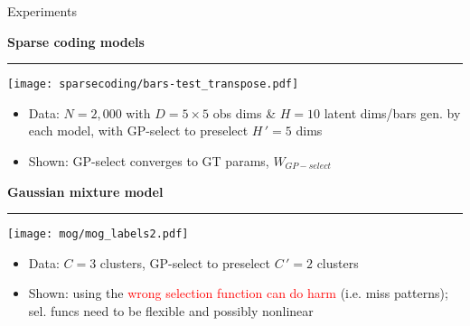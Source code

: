 \documentclass[final]{beamer}
\newcommand{\highlight}[1]{\textcolor{blocktbgn}{#1}}
\newcommand{\subhead}[1]{ \centering \textbf{#1}                                                                                                                                                                 \vskip-1.7\baselineskip~\\
\rule{\linewidth}{1pt}
\vspace{-0.9cm}
}
\begin{document}
\begin{frame}{}
\begin{columns}[t]
  \begin{column}{.32\linewidth}
    \begin{block}{Experiments}

    \vspace{-.5cm}
      \subhead{Sparse coding models}
            \vspace{.25cm}
                \texttt{[image: sparsecoding/bars-test\_transpose.pdf]}\\
            \vspace{.05cm}
           \begin{itemize}
            \item \highlight{Data}: $N=2,000$ with $D=5\times5$ obs dims \& \highlight{$H=10$ latent dims/bars} gen. by each model, with
                \highlight{GP-select} to preselect \highlight{$H\,' = 5$ dims}
            \item \highlight{Shown}: GP-select \highlight{converges to GT params}, $W_{GP-select}$ %
          \end{itemize}

\vspace{-.2cm}
     \subhead{Gaussian mixture model} 
        \vspace{.15cm}
                \texttt{[image: mog/mog\_labels2.pdf]}\\
           \vspace{.2cm}
           \begin{itemize}
            \item \highlight{Data}: \highlight{$C=3$ clusters}, \highlight{GP-select} to preselect \highlight{$C\,'=2$ clusters}
            \item \highlight{Shown}: using the \textcolor{red}{wrong selection function can do harm} (i.e. miss patterns); sel. funcs need to be \textcolor{dg}{flexible} and possibly \textcolor{dg}{nonlinear}
          \end{itemize}


\end{block}
\end{column}
\end{columns}
\end{frame}
\end{document}
